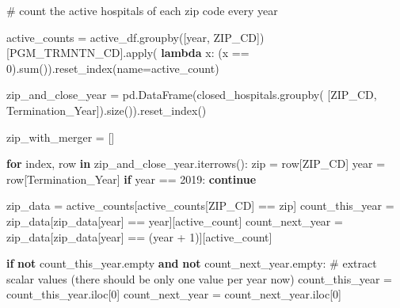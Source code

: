 \documentclass[
  letterpaper,
  DIV=11,
  numbers=noendperiod]{scrartcl}
\newenvironment{Shaded}{\begin{snugshade}}{\end{snugshade}}
\newcommand{\BuiltInTok}[1]{\textcolor[rgb]{0.00,0.23,0.31}{#1}}
\newcommand{\CommentTok}[1]{\textcolor[rgb]{0.37,0.37,0.37}{#1}}
\newcommand{\ControlFlowTok}[1]{\textcolor[rgb]{0.00,0.23,0.31}{\textbf{#1}}}
\newcommand{\DecValTok}[1]{\textcolor[rgb]{0.68,0.00,0.00}{#1}}
\newcommand{\KeywordTok}[1]{\textcolor[rgb]{0.00,0.23,0.31}{\textbf{#1}}}
\newcommand{\NormalTok}[1]{\textcolor[rgb]{0.00,0.23,0.31}{#1}}
\newcommand{\OperatorTok}[1]{\textcolor[rgb]{0.37,0.37,0.37}{#1}}
\newcommand{\StringTok}[1]{\textcolor[rgb]{0.13,0.47,0.30}{#1}}
\begin{document}
\begin{Shaded}
\begin{Highlighting}[]
\CommentTok{\# count the active hospitals of each zip code every year}

\NormalTok{active\_counts }\OperatorTok{=}\NormalTok{ active\_df.groupby([}\StringTok{\textquotesingle{}year\textquotesingle{}}\NormalTok{, }\StringTok{\textquotesingle{}ZIP\_CD\textquotesingle{}}\NormalTok{])[}\StringTok{\textquotesingle{}PGM\_TRMNTN\_CD\textquotesingle{}}\NormalTok{].}\BuiltInTok{apply}\NormalTok{(}
    \KeywordTok{lambda}\NormalTok{ x: (x }\OperatorTok{==} \DecValTok{0}\NormalTok{).}\BuiltInTok{sum}\NormalTok{()).reset\_index(name}\OperatorTok{=}\StringTok{\textquotesingle{}active\_count\textquotesingle{}}\NormalTok{)}

\NormalTok{zip\_and\_close\_year }\OperatorTok{=}\NormalTok{ pd.DataFrame(closed\_hospitals.groupby(}
\NormalTok{    [}\StringTok{\textquotesingle{}ZIP\_CD\textquotesingle{}}\NormalTok{, }\StringTok{\textquotesingle{}Termination\_Year\textquotesingle{}}\NormalTok{]).size()).reset\_index()}

\NormalTok{zip\_with\_merger }\OperatorTok{=}\NormalTok{ []}

\ControlFlowTok{for}\NormalTok{ index, row }\KeywordTok{in}\NormalTok{ zip\_and\_close\_year.iterrows():}
    \BuiltInTok{zip} \OperatorTok{=}\NormalTok{ row[}\StringTok{\textquotesingle{}ZIP\_CD\textquotesingle{}}\NormalTok{]}
\NormalTok{    year }\OperatorTok{=}\NormalTok{ row[}\StringTok{\textquotesingle{}Termination\_Year\textquotesingle{}}\NormalTok{]}
    \ControlFlowTok{if}\NormalTok{ year }\OperatorTok{==} \DecValTok{2019}\NormalTok{:}
        \ControlFlowTok{continue}

\NormalTok{    zip\_data }\OperatorTok{=}\NormalTok{ active\_counts[active\_counts[}\StringTok{\textquotesingle{}ZIP\_CD\textquotesingle{}}\NormalTok{] }\OperatorTok{==} \BuiltInTok{zip}\NormalTok{]}
\NormalTok{    count\_this\_year }\OperatorTok{=}\NormalTok{ zip\_data[zip\_data[}\StringTok{\textquotesingle{}year\textquotesingle{}}\NormalTok{] }\OperatorTok{==}\NormalTok{ year][}\StringTok{\textquotesingle{}active\_count\textquotesingle{}}\NormalTok{]}
\NormalTok{    count\_next\_year }\OperatorTok{=}\NormalTok{ zip\_data[zip\_data[}\StringTok{\textquotesingle{}year\textquotesingle{}}\NormalTok{] }\OperatorTok{==}\NormalTok{ (year }\OperatorTok{+} \DecValTok{1}\NormalTok{)][}\StringTok{\textquotesingle{}active\_count\textquotesingle{}}\NormalTok{]}

    \ControlFlowTok{if} \KeywordTok{not}\NormalTok{ count\_this\_year.empty }\KeywordTok{and} \KeywordTok{not}\NormalTok{ count\_next\_year.empty:}
        \CommentTok{\# extract scalar values (there should be only one value per year now)}
\NormalTok{        count\_this\_year }\OperatorTok{=}\NormalTok{ count\_this\_year.iloc[}\DecValTok{0}\NormalTok{]}
\NormalTok{        count\_next\_year }\OperatorTok{=}\NormalTok{ count\_next\_year.iloc[}\DecValTok{0}\NormalTok{]}


\end{Highlighting}
\end{Shaded}
\end{document}
